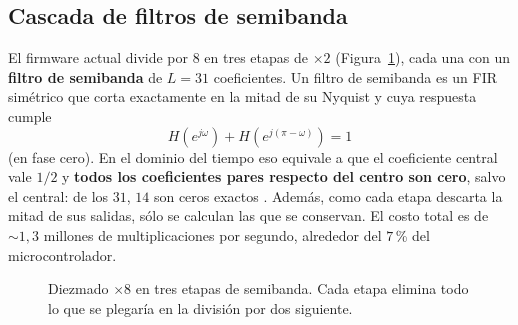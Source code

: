 \subsection{Cascada de filtros de semibanda}

El firmware actual divide por $8$ en tres etapas de $\times 2$
(Figura~\ref{fig:proc_semibanda}), cada una con un \textbf{filtro de
semibanda} de $L = 31$ coeficientes. Un filtro de semibanda es un FIR
simétrico que corta exactamente en la mitad de su Nyquist y cuya respuesta
cumple
\begin{equation}
  H\!\left(e^{j\omega}\right) + H\!\left(e^{j(\pi-\omega)}\right) = 1
  \label{eq:proc_semibanda}
\end{equation}
(en fase cero). En el dominio del tiempo eso equivale a que el coeficiente
central vale $1/2$ y \textbf{todos los coeficientes pares respecto del
centro son cero}, salvo el central: de los $31$, $14$ son ceros exactos
\cite{Crochiere1983}. Además, como cada etapa descarta la mitad de sus
salidas, sólo se calculan las que se conservan. El costo total es de
$\sim 1{,}3$ millones de multiplicaciones por segundo, alrededor del
$7$\,\% del microcontrolador.

\begin{figure}[H]
  \centering
  \caption{Diezmado $\times 8$ en tres etapas de semibanda. Cada etapa
  elimina todo lo que se plegaría en la división por dos siguiente.}
  \label{fig:proc_semibanda}
\end{figure}


